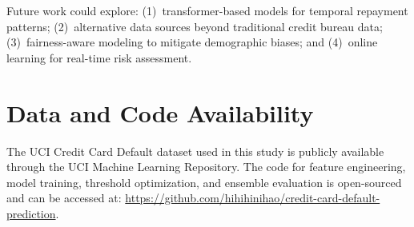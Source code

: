 \documentclass[conference]{IEEEtran}
\begin{document}
Future work could explore: (1)~transformer-based models for temporal repayment patterns; (2)~alternative data sources beyond traditional credit bureau data; (3)~fairness-aware modeling to mitigate demographic biases; and (4)~online learning for real-time risk assessment.

\section{Data and Code Availability}
The UCI Credit Card Default dataset used in this study is publicly available through the UCI Machine Learning Repository. The code for feature engineering, model training, threshold optimization, and ensemble evaluation is open-sourced and can be accessed at: \url{https://github.com/hihihinihao/credit-card-default-prediction}.
\end{document}
